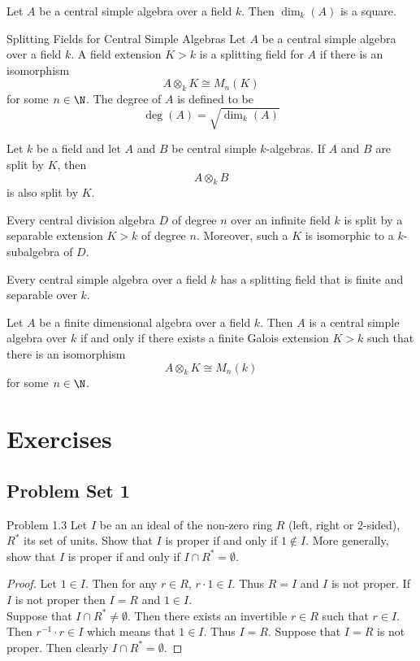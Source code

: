 \documentclass[a4paper]{article}
\begin{document}
\begin{crl}{}{} Let $A$ be a central simple algebra over a field $k$. Then $\dim_k(A)$ is a square. 
\end{crl}

\begin{defn}{Splitting Fields for Central Simple Algebras}{} Let $A$ be a central simple algebra over a field $k$. A field extension $K>k$ is a splitting field for $A$ if there is an isomorphism $$A\otimes_kK\cong M_n(K)$$ for some $n\in\N$. The degree of $A$ is defined to be $$\deg(A)=\sqrt{\dim_k(A)}$$
\end{defn}

\begin{lmm}{}{} Let $k$ be a field and let $A$ and $B$ be central simple $k$-algebras. If $A$ and $B$ are split by $K$, then $$A\otimes_k B$$ is also split by $K$. 
\end{lmm}

\begin{thm}{}{} Every central division algebra $D$ of degree $n$ over an infinite field $k$ is split by a separable extension $K>k$ of degree $n$. Moreover, such a $K$ is isomorphic to a $k$-subalgebra of $D$. 
\end{thm}

\begin{crl}{}{} Every central simple algebra over a field $k$ has a splitting field that is finite and separable over $k$. 
\end{crl}

\begin{crl}{}{} Let $A$ be a finite dimensional algebra over a field $k$. Then $A$ is a central simple algebra over $k$ if and only if there exists a finite Galois extension $K>k$ such that there is an isomorphism $$A\otimes_k K\cong M_n(k)$$ for some $n\in\N$. 
\end{crl}

\pagebreak
\section{Exercises}
\subsection{Problem Set 1}
\begin{ex}{Problem 1.3}{} Let $I$ be an an ideal of the non-zero ring $R$ (left, right or $2$-sided), $R^\ast$ its set of units. Show that $I$ is proper if and only if $1\notin I$. More generally, show that $I$ is proper if and only if $I\cap R^\ast=\emptyset$. 
\begin{proof}
Let $1\in I$. Then for any $r\in R$, $r\cdot 1\in I$. Thus $R=I$ and $I$ is not proper. If $I$ is not proper then $I=R$ and $1\in I$. \\

Suppose that $I\cap R^\ast\neq\emptyset$. Then there exists an invertible $r\in R$ such that $r\in I$. Then $r^{-1}\cdot r\in I$ which means that $1\in I$. Thus $I=R$. Suppose that $I=R$ is not proper. Then clearly $I\cap R^\ast=\emptyset$. 
\end{proof}
\end{ex}
\end{document}
